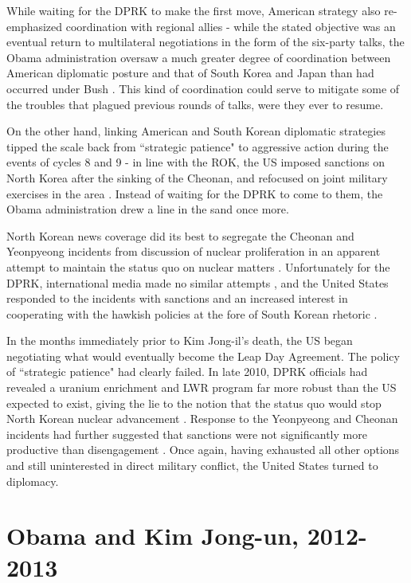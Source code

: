 While waiting for the DPRK to make the first move, American strategy also re-emphasized coordination with regional allies - while the stated objective was an eventual return to multilateral negotiations in the form of the six-party talks, the Obama administration oversaw a much greater degree of coordination between American diplomatic posture and that of South Korea and Japan than had occurred under Bush \cite{crs13,snyder2}. This kind of coordination could serve to mitigate some of the troubles that plagued previous rounds of talks, were they ever to resume.

On the other hand, linking American and South Korean diplomatic strategies tipped the scale back from ``strategic patience" to aggressive action during the events of cycles 8 and 9 - in line with the ROK, the US imposed sanctions on North Korea after the sinking of the Cheonan, and refocused on joint military exercises in the area \cite{starr}. Instead of waiting for the DPRK to come to them, the Obama administration drew a line in the sand once more.

North Korean news coverage did its best to segregate the Cheonan and Yeonpyeong incidents from discussion of nuclear proliferation in an apparent attempt to maintain the status quo on nuclear matters \cite{rich12}. Unfortunately for the DPRK, international media made no similar attempts \cite{beal}, and the United States responded to the incidents with sanctions and an increased interest in cooperating with the hawkish policies at the fore of South Korean rhetoric \cite{crs13}.

In the months immediately prior to Kim Jong-il's death, the US began negotiating what would eventually become the Leap Day Agreement. The policy of ``strategic patience" had clearly failed. In late 2010, DPRK officials had revealed a uranium enrichment and LWR program far more robust than the US expected to exist, giving the lie to the notion that the status quo would stop North Korean nuclear advancement \cite{snyder2}. Response to the Yeonpyeong and Cheonan incidents had further suggested that sanctions were not significantly more productive than disengagement \cite{delury}. Once again, having exhausted all other options and still uninterested in direct military conflict, the United States turned to diplomacy.

\section{Obama and Kim Jong-un, 2012-2013}

